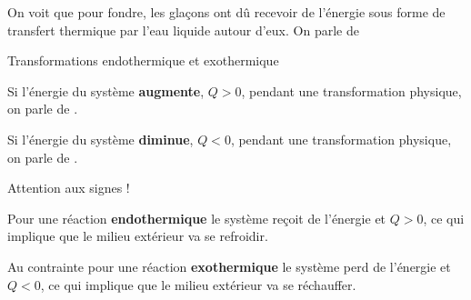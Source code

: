 

\newpage
\vspace*{-12pt}

On voit que pour fondre, les glaçons ont dû recevoir de l'énergie sous forme de transfert thermique par l'eau liquide autour d'eux.
On parle de 

\begin{doc}{Transformations endothermique et exothermique}
  \vspace*{-20pt}
  \begin{encart}
    \begin{listePoints}
      \item Si l'énergie du système \textbf{augmente}, $Q > 0$, pendant une transformation physique, on parle de .
      \item Si l'énergie du système \textbf{diminue}, $Q < 0$, pendant une transformation physique, on parle de .
    \end{listePoints}
  \end{encart}
  \begin{center}
  \end{center}
  \attention Attention aux signes !
  
  \begin{listePoints}
    \item Pour une réaction \textbf{endothermique} le système reçoit de l'énergie et $Q > 0$, ce qui implique que le milieu extérieur va se refroidir. 
    \item Au contrainte pour une réaction \textbf{exothermique} le système perd de l'énergie et $Q < 0$, ce qui implique que le milieu extérieur va se réchauffer.
  \end{listePoints}
\end{doc}
